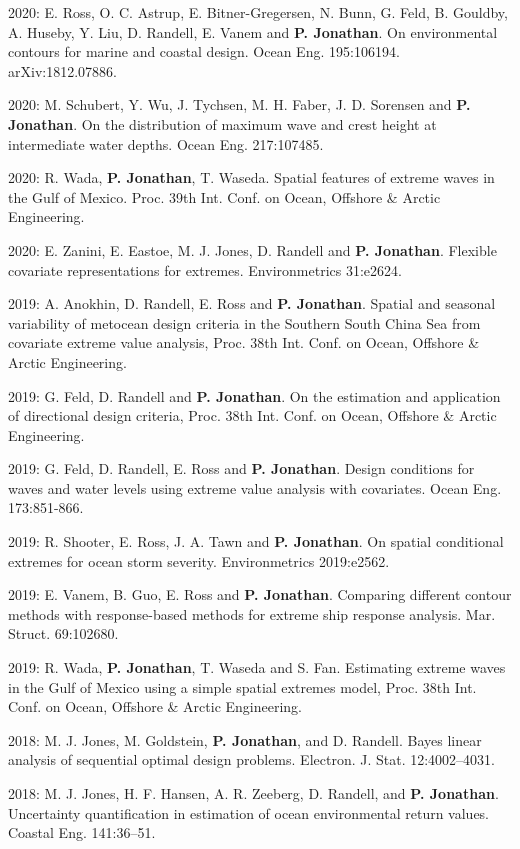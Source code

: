 \documentclass[11pt,a4paper]{moderncv}
\begin{document}
2020: E. Ross, O. C. Astrup, E. Bitner-Gregersen, N. Bunn, G. Feld, B. Gouldby, A. Huseby, Y. Liu,  D. Randell, E. Vanem and \textbf{P. Jonathan}. On environmental contours for marine and coastal design. Ocean Eng. 195:106194. arXiv:1812.07886.

2020: M. Schubert, Y. Wu,  J. Tychsen, M. H. Faber, J. D. Sorensen and \textbf{P. Jonathan}. On the distribution of maximum wave and crest height at intermediate water depths. Ocean Eng. 217:107485.

2020: R. Wada, \textbf{P. Jonathan}, T. Waseda. Spatial features of extreme waves in the Gulf of Mexico. Proc. 39th Int. Conf. on Ocean, Offshore \& Arctic Engineering.

2020: E. Zanini, E. Eastoe, M. J. Jones, D. Randell and \textbf{P. Jonathan}. Flexible covariate representations for extremes. Environmetrics 31:e2624.

2019: A. Anokhin, D. Randell, E. Ross and \textbf{P. Jonathan}. Spatial and seasonal variability of metocean design criteria in the Southern South China Sea from covariate extreme value analysis, Proc. 38th Int. Conf. on Ocean, Offshore \& Arctic Engineering.

2019: G. Feld, D. Randell and \textbf{P. Jonathan}. On the estimation and application of directional design criteria, Proc. 38th Int. Conf. on Ocean, Offshore \& Arctic Engineering. 

2019: G. Feld, D. Randell, E. Ross and \textbf{P. Jonathan}. Design conditions for waves and water levels using extreme value analysis with covariates. Ocean Eng. 173:851-866.

2019: R. Shooter, E. Ross, J. A. Tawn and \textbf{P. Jonathan}. On spatial conditional extremes for ocean storm severity. Environmetrics 2019:e2562.

2019: E. Vanem, B. Guo, E. Ross and \textbf{P. Jonathan}. Comparing different contour methods with response-based methods for extreme ship response analysis. Mar. Struct. 69:102680.

2019: R. Wada, \textbf{P. Jonathan}, T. Waseda and S. Fan. Estimating extreme waves in the Gulf of Mexico using a simple spatial extremes model, Proc. 38th Int. Conf. on Ocean, Offshore \& Arctic Engineering.

2018: M. J. Jones, M. Goldstein, \textbf{P. Jonathan}, and D. Randell. Bayes linear analysis of sequential optimal design problems. Electron. J. Stat. 12:4002--4031.

2018: M. J. Jones, H. F. Hansen, A. R. Zeeberg, D. Randell, and \textbf{P. Jonathan}. Uncertainty quantification in estimation of ocean environmental return values. Coastal Eng. 141:36--51.
\end{document}
